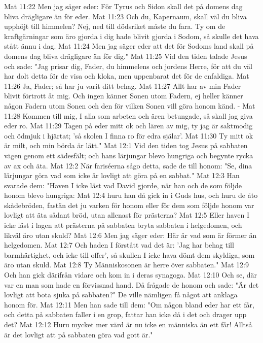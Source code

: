Mat 11:22  Men jag säger eder: För Tyrus och Sidon skall det på domens dag bliva drägligare än för eder.
Mat 11:23  Och du, Kapernaum, skall väl du bliva upphöjt till himmelen? Nej, ned till dödsriket måste du fara. Ty om de kraftgärningar som äro gjorda i dig hade blivit gjorda i Sodom, så skulle det hava stått ännu i dag.
Mat 11:24  Men jag säger eder att det för Sodoms land skall på domens dag bliva drägligare än för dig."
Mat 11:25  Vid den tiden talade Jesus och sade: "Jag prisar dig, Fader, du himmelens och jordens Herre, för att du väl har dolt detta för de visa och kloka, men uppenbarat det för de enfaldiga.
Mat 11:26  Ja, Fader; så har ju varit ditt behag.
Mat 11:27  Allt har av min Fader blivit förtrott åt mig. Och ingen känner Sonen utom Fadern, ej heller känner någon Fadern utom Sonen och den för vilken Sonen vill göra honom känd. -
Mat 11:28  Kommen till mig, I alla som arbeten och ären betungade, så skall jag giva eder ro.
Mat 11:29  Tagen på eder mitt ok och lären av mig, ty jag är saktmodig och ödmjuk i hjärtat; 'så skolen I finna ro för edra själar'.
Mat 11:30  Ty mitt ok är milt, och min börda är lätt."
Mat 12:1  Vid den tiden tog Jesus på sabbaten vägen genom ett sädesfält; och hans lärjungar blevo hungriga och begynte rycka av ax och äta.
Mat 12:2  När fariséerna sågo detta, sade de till honom: "Se, dina lärjungar göra vad som icke är lovligt att göra på en sabbat."
Mat 12:3  Han svarade dem: "Haven I icke läst vad David gjorde, när han och de som följde honom blevo hungriga:
Mat 12:4  huru han då gick in i Guds hus, och huru de åto skådebröden, fastän det ju varken för honom eller för dem som följde honom var lovligt att äta sådant bröd, utan allenast för prästerna?
Mat 12:5  Eller haven I icke läst i lagen att prästerna på sabbaten bryta sabbaten i helgedomen, och likväl äro utan skuld?
Mat 12:6  Men jag säger eder: Här är vad som är förmer än helgedomen.
Mat 12:7  Och haden I förstått vad det är: 'Jag har behag till barmhärtighet, och icke till offer', så skullen I icke hava dömt dem skyldiga, som äro utan skuld.
Mat 12:8  Ty Människosonen är herre över sabbaten."
Mat 12:9  Och han gick därifrån vidare och kom in i deras synagoga.
Mat 12:10  Och se, där var en man som hade en förvissnad hand. Då frågade de honom och sade: "Är det lovligt att bota sjuka på sabbaten?" De ville nämligen få något att anklaga honom för.
Mat 12:11  Men han sade till dem: "Om någon bland eder har ett får, och detta på sabbaten faller i en grop, fattar han icke då i det och drager upp det?
Mat 12:12  Huru mycket mer värd är nu icke en människa än ett får! Alltså är det lovligt att på sabbaten göra vad gott är."
